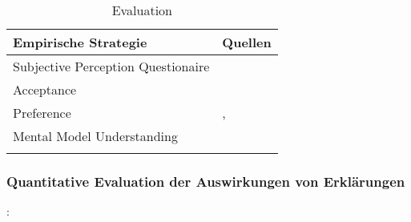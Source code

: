 \begin{table}[htb!]
    \begin{center}
        \begin{tabular}{|p{}|p{}|}
            \hline
            \textbf{Empirische Strategie} & \textbf{Quellen} \\ \hline
            Subjective Perception Questionaire &  \cite{balog_measuring_2020} \cite{sato_context_nodate}
                                                                \cite{waa_evaluating_2021} \cite{eiband_impact_2019}  \cite{kouki_user_2017} \cite{tsai_evaluating_2019}
                                                                \cite{hernandez-bocanegra_effects_2020}
                                                                \cite{zahedi_towards_2019} \cite{tsai_effects_2020} 
                                                                \cite{ribera2019can} \\
            Acceptance                        & \cite{tintarev_designing_nodate}
                                                            \cite{hernandez-bocanegra_effects_2020}
                                                            \cite{kunkel_let_2019} \\
            
            Preference                        & \cite{kouki_user_2017} \cite{mucha_interfaces_2021} 
                                                            \cite{abdulrahman_belief-based_2019} 
                                                            \cite{waa_evaluating_2021} \cite{wiegand_id_2020} ,
                                                            \cite{stange_effects_2021} \cite{kaptein_personalised_2017} \\
            Mental Model Understanding        & \cite{gunning2019darpa} \\
             \\
            \hline
        \end{tabular}
    \end{center}
    \caption{Evaluation}
    \label{tab:evaluation_of_explanations}
\end{table}

\subsubsection{Quantitative Evaluation der Auswirkungen von Erklärungen}

\cite{tintarev2007survey}:

